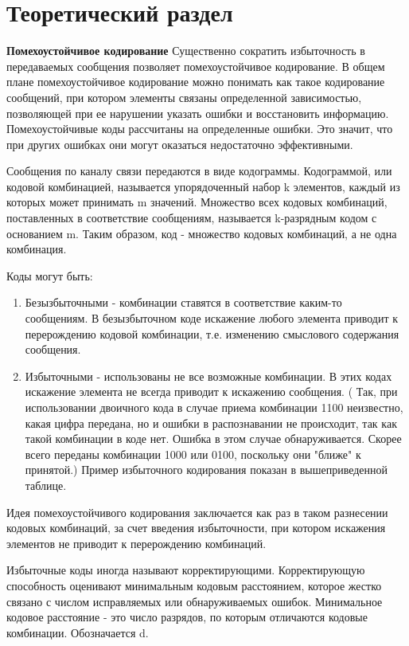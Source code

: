 \documentclass[a4paper,14pt]{extarticle}
\begin{document}
\section{Теоретический раздел}

\textbf{Помехоустойчивое кодирование}
Существенно сократить избыточность в передаваемых сообщения позволяет помехоустойчивое кодирование. В общем плане помехоустойчивое кодирование можно понимать как такое кодирование сообщений, при котором элементы связаны определенной зависимостью, позволяющей при ее нарушении указать ошибки и восстановить информацию. Помехоустойчивые коды рассчитаны на определенные ошибки. Это значит, что при других ошибках они могут оказаться недостаточно эффективными.	

Сообщения по каналу связи передаются в виде кодограммы. Кодограммой, или кодовой комбинацией, называется упорядоченный набор k элементов, каждый из которых может принимать m значений.
Множество всех кодовых комбинаций, поставленных в соответствие сообщениям, называется k-разрядным кодом с основанием m. Таким образом, код - множество кодовых комбинаций, а не одна комбинация.

Коды могут быть:
\begin{enumerate}

\item Безызбыточными - комбинации ставятся в соответствие каким-то сообщениям. В безызбыточном коде искажение любого элемента приводит к перерождению кодовой комбинации, т.е. изменению смыслового содержания сообщения.
\item Избыточными - использованы не все возможные комбинации. В этих кодах искажение элемента не всегда приводит к искажению сообщения. ( Так, при использовании двоичного кода в случае приема комбинации 1100 неизвестно, какая цифра передана, но и ошибки в распознавании не происходит, так как такой комбинации в коде нет. Ошибка в этом случае обнаруживается. Скорее всего переданы комбинации 1000 или 0100, поскольку они "ближе" к принятой.) Пример избыточного кодирования показан в вышеприведенной таблице.
\end{enumerate}

Идея помехоустойчивого кодирования заключается как раз в таком разнесении кодовых комбинаций, за счет введения избыточности, при котором искажения элементов не приводит к перерождению комбинаций. 

Избыточные коды иногда называют корректирующими.
Корректирующую способность оценивают минимальным кодовым расстоянием, которое жестко связано с числом исправляемых или обнаруживаемых ошибок. Минимальное кодовое расстояние - это число разрядов, по которым отличаются кодовые комбинации. Обозначается d.
\end{document}
